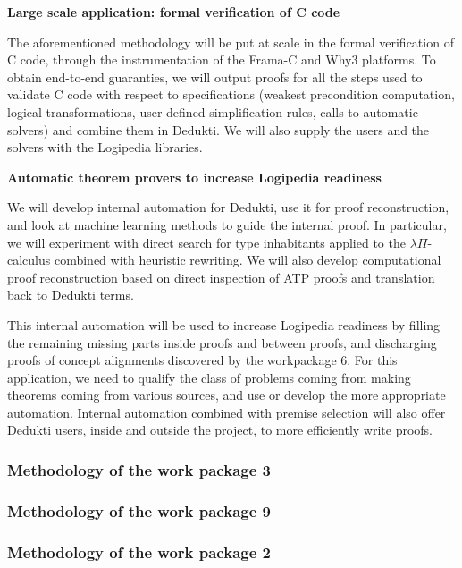 {\bf \large Large scale application: formal verification of C code}

The aforementioned methodology will be put at scale in the formal
verification of C code, through the instrumentation of the Frama-C and
Why3 platforms. To obtain end-to-end guaranties, we will output proofs
for all the steps used to validate C code with respect to specifications
(weakest precondition computation, logical transformations, user-defined
simplification rules, calls to automatic solvers) and combine them in
Dedukti. We will also supply the users and the solvers with the
Logipedia libraries.


{\bf \large Automatic theorem provers to increase Logipedia readiness}

We will develop internal automation for Dedukti, use it for proof
reconstruction, and look at machine learning methods to guide the
internal proof. In particular, we will experiment with direct search for
type inhabitants applied to the $\lambda\Pi$-calculus combined with
heuristic rewriting. We will also develop computational proof
reconstruction based on direct inspection of ATP proofs and translation
back to Dedukti terms.

This internal automation will be used to increase Logipedia readiness by
filling the remaining missing parts inside proofs and between proofs,
and discharging proofs of concept alignments discovered by the
workpackage 6. For this application, we need to qualify the class of
problems coming from making theorems coming from various sources, and
use or develop the more appropriate automation. Internal automation
combined with premise selection will also offer Dedukti users, inside
and outside the project, to more efficiently write proofs.


\subsubsection{Methodology of the work package 3}

\subsubsection{Methodology of the work package 9}

\subsubsection{Methodology of the work package 2}

